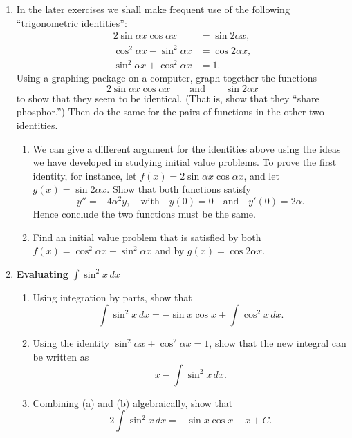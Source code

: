 \begin{enumerate}
\item In the later exercises we shall make frequent use of the
following \label{`trig'} ``trigonometric
identities'':
\begin{align*}
    2 \sin{\alpha x} \cos{\alpha x} &= \sin{2\alpha x}, \\
\cos^2{\alpha x} - \sin^2{\alpha x} &=  \cos{2\alpha x}, \\
\sin^2{\alpha x} + \cos^2{\alpha x} &= 1.
\end{align*}
Using a graphing package on a computer, graph together the functions
	\[
2 \sin{\alpha x} \cos{\alpha x} \qquad \mbox{and} 
		\qquad \sin{2\alpha x}
\]
to show that they seem to be identical.  (That is, show that they
``share phosphor.'')  Then do the same for the pairs of functions in
the other two identities.

  \begin{enumerate}
  \item We can give a different argument for the identities above using
the ideas we have developed in studying initial value problems.  To
prove the first identity, for instance, let $f(x) = 2 \sin{\alpha x}
\cos{\alpha x}$, and let $g(x) = \sin{2\alpha x}$.  Show that both
functions satisfy
\[
y'' = -4\alpha^2 y, \quad\mbox{with}\quad 
    y(0)=0\quad\mbox{and}\quad y'(0)=2\alpha.
\]
Hence conclude the two functions must be the same.

  \item Find an initial value problem that is satisfied by both
$f(x)=\cos^2{\alpha x} - \sin^2{\alpha x}$ and by $g(x) = \cos{2\alpha
  x}$.


\end{enumerate}
\item {\bf Evaluating } $\displaystyle \int \sin^2{x} \, dx$


  \begin{enumerate}
  \item Using integration by parts, show that
	\[
\int \sin^2{x} \, dx = 
		- \sin{x} \cos{x} + \int \cos^2{x} \, dx.
\]


  \item Using the identity $\sin^2{\alpha x} + \cos^2{\alpha x} = 1$,
show that the new integral can be written as
	\[
x - \int \sin^2{x} \, dx.
\]


  \item Combining (a) and (b) algebraically, show that
	\[
2 \int \sin^2{x} \, dx = - \sin{x} \cos{x} + x + C.
\]



\end{enumerate}
\end{enumerate}
